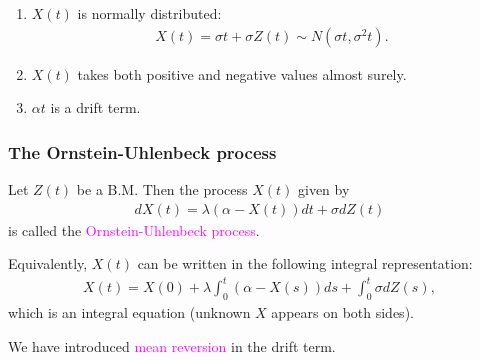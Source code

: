 \begin{frame}[fragile,t]
	\begin{remark}
		\begin{enumerate}
			\item $X(t)$ is normally distributed:
				 \begin{align*}
					 X(t) = \sigma t + \sigma Z(t) \sim N\left(\sigma t, \sigma^2 t\right).
				\end{align*}

			\item $X(t)$ takes both positive and negative values almost surely.

			\item $\alpha t$ is a drift term.
		\end{enumerate}
	\end{remark}
\end{frame}
\begin{frame}[fragile,t]
	\frametitle{The Ornstein-Uhlenbeck process}
\begin{mydefinition}
	Let $Z(t)$ be a B.M. Then the process $X(t)$ given by
	 \begin{align*}
		 dX(t) = \lambda \left(\alpha - X(t)\right) dt+ \sigma d Z(t)
	\end{align*}
	is called the \textcolor{magenta}{Ornstein-Uhlenbeck process}.
\end{mydefinition}
\end{frame}
\begin{frame}[fragile,t]
\begin{remark}
	Equivalently, $X(t)$ can be written in the following integral representation:
	\begin{align*}
		X(t) = X(0) + \lambda \int_0^t \left(\alpha - X(s)\right) ds + \int_0^t \sigma dZ(s),
	\end{align*}
	which is an integral equation (unknown $X$ appears on both sides).
\end{remark}
\bigskip
\begin{remark}
	We have introduced \textcolor{magenta}{mean reversion} in the drift term.
\end{remark}
\end{frame}
